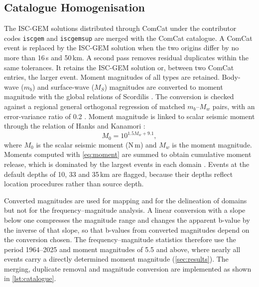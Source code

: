 \documentclass[11pt]{article}
\begin{document}
\subsection{Catalogue Homogenisation}
The ISC-GEM solutions distributed through ComCat under the contributor codes
\texttt{iscgem} and \texttt{iscgemsup} are merged with the ComCat catalogue. A
ComCat event is replaced by the ISC-GEM solution when the two origins differ by no
more than 16\,s and 50\,km. A second pass removes residual duplicates within the
same tolerances. It retains the ISC-GEM solution or, between two ComCat entries,
the larger event. Moment magnitudes of all types are retained. Body-wave ($m_b$) and
surface-wave ($M_S$) magnitudes are converted to moment magnitude with the global
relations of Scordilis \cite{Scordilis2006}. The conversion is checked against a
regional general orthogonal regression of matched $m_b$--$M_w$ pairs, with an
error-variance ratio of 0.2 \cite{Das2011}. Moment magnitude is linked to scalar
seismic moment through the relation of Hanks and Kanamori \cite{Hanks1979,
Kanamori1977}:
\begin{equation}
  M_0 = 10^{1.5 M_w + 9.1}, \label{eq:moment}
\end{equation}
where $M_0$ is the scalar seismic moment (N\,m) and $M_w$ is the moment magnitude.
Moments computed with \cref{eq:moment} are summed to obtain cumulative moment
release, which is dominated by the largest events in each domain \cite{Kagan2002}.
Events at the default depths of 10, 33 and 35\,km are flagged, because their depths
reflect location procedures rather than source depth.

Converted magnitudes are used for mapping and for the delineation of domains but not
for the frequency--magnitude analysis. A linear conversion with a slope below one
compresses the magnitude range and changes the apparent b-value by the inverse of
that slope, so that b-values from converted magnitudes depend on the conversion
chosen. The frequency--magnitude statistics therefore use the period 1964--2025 and
moment magnitudes of 5.5 and above, where nearly all events carry a directly
determined moment magnitude (\cref{sec:results}). The merging, duplicate removal and
magnitude conversion are implemented as shown in \cref{lst:catalogue}.
\end{document}

